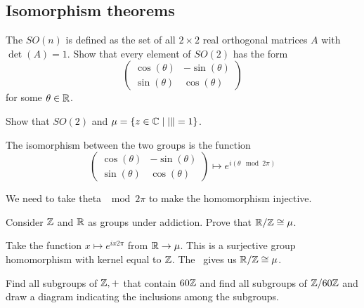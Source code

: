 \subsection{Isomorphism theorems}
\begin{questions}
  \begin{question}
    The  \(SO(n)\) is defined as the set of all \(2 \times 2\) real orthogonal matrices \(A\) with \(\det(A) = 1\). Show that every element of \(SO(2)\) has the form
    \[\begin{pmatrix}
      \cos(\theta) & -\sin(\theta) \\
      \sin(\theta) & \cos(\theta)
    \end{pmatrix}\]
    for some \(\theta \in \mathbb{R}\).
  \end{question}

  \begin{solution}
  \end{solution}

  \begin{question}
   Show that \(SO(2)\) and \(\mu = \{z \in \mathbb{C} \mid |\| = 1 \}\).
  \end{question}

  \begin{solution}
    The isomorphism between the two groups is the function
    \[\begin{pmatrix}
      \cos(\theta) & -\sin(\theta) \\
      \sin(\theta) & \cos(\theta)
    \end{pmatrix} \mapsto e^{i (\theta \mod 2\pi)}\]
  \end{solution}

  We need to take theta \(\mod 2 \pi\) to make the homomorphism injective.

  \begin{question}
    Consider \(\mathbb{Z}\) and \(\mathbb{R}\) as groups under addiction. Prove that \(\mathbb{R} / \mathbb{Z} \cong \mu\).
  \end{question}

  \begin{solution}
    Take the function \(x \mapsto e^{ix2\pi}\) from \(\mathbb{R} \to \mu\). This is a surjective group homomorphism with kernel equal to \(\mathbb{Z}\). The~ gives us \(\mathbb{R}/\mathbb{Z} \cong \mu\).
  \end{solution}

  \begin{question}
    Find all subgroups of \(\mathbb{Z}, +\) that contain \(60\mathbb{Z}\) and find all subgroups of \(\mathbb{Z} / 60\mathbb{Z}\) and draw a diagram indicating the inclusions among the subgroups.
  \end{question}


\end{questions}
